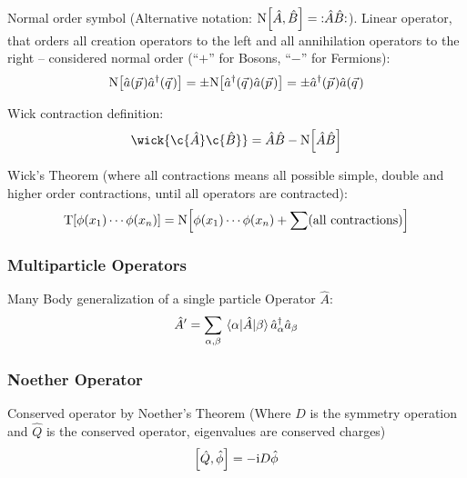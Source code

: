 			\noindent
			Normal order symbol (Alternative notation: $\mathrm{N}\qty[\hat{A},\hat{B}] = \;:\mathrel{\hat{A} \hat{B}}:$). Linear operator, that orders all creation operators to the left and all annihilation operators to the right -- considered normal order (``$+$'' for Bosons, ``$-$'' for Fermions):
			\begin{equation}
				\begin{aligned}
					\NormalOrder{\hat{a}(\vec{p})\hat{a}^\dagger(\vec{q})}
					&= \pm \NormalOrder{\hat{a}^\dagger(\vec{q})\hat{a}(\vec{p})} = \pm \hat{a}^\dagger(\vec{p}) \hat{a}(\vec{q}) \\
				\end{aligned}
			\end{equation}

			\noindent
			Wick contraction definition:
			\begin{equation}
				\wick{\c{\hat{A}} \c{\hat{B}}} = \hat{A}\hat{B} - \NormalOrder{\hat{A}\hat{B}}
			\end{equation}

			\noindent
			Wick's Theorem (where all contractions means all possible simple, double and higher order contractions, until all operators are contracted):
			\begin{equation}
				\mathrm{T}\qty[\phi(x_1)\dotsb\phi(x_n)] = \mathrm{N}\qty[\phi(x_1)\dotsb\phi(x_n) + \sum(\text{all contractions})]
			\end{equation}

		\subsubsection{Multiparticle Operators}
			Many Body generalization of a single particle Operator $\hat{A}$:
			\begin{equation}
				\hat{A}' = \sum_{\alpha,\beta} \mel{\alpha}{\hat{A}}{\beta} \hat{a}_\alpha^\dagger \hat{a}_\beta
			\end{equation}

		\subsubsection{Noether Operator}
			\noindent
			Conserved operator by Noether's Theorem (Where $D$ is the symmetry operation and $\hat{Q}$ is the conserved operator, \ie eigenvalues are conserved charges)
			\begin{equation}
				\comm{\hat{Q}}{\hat{\phi}} = -\i D\hat{\phi}
			\end{equation}

